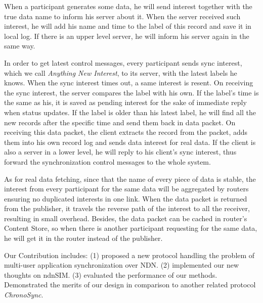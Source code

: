 \documentclass[conference]{IEEEtran}
\begin{document}
When a participant generates some data, he will send interest together with the true data name to inform his server about it. When the server received such interest, he will add his name and time to the label of this record and save it in local log. If there is an upper level server, he will inform his server again in the same way. 

In order to get latest control messages, every participant sends sync interest, which we call \emph{Anything New Interest}, to its server, with the latest labels he knows. When the sync interest times out, a same interest is resent. On receiving the sync interest, the server compares the label with his own. If the label's time is the same as his, it is saved as pending interest for the sake of immediate reply when status updates. If the label is older than his latest label, he will find all the new records after the specific time and send them back in data packet. On receiving this data packet, the client extracts the record from the packet, adds them into his own record log and sends data interest for real data. If the client is also a server in a lower level, he will reply to his client's sync interest, thus forward the synchronization control messages to the whole system.

As for real data fetching, since that the name of every piece of data is stable, the interest from every participant for the same data will be aggregated by routers ensuring no duplicated interests in one link. When the data packet is returned from the publisher, it travels the reverse path of the interest to all the receiver, resulting in small overhead. Besides, the data packet can be cached in router's Content Store, so when there is another participant requesting for the same data, he will get it in the router instead of the publisher.

Our Contribution includes: (1) proposed a new protocol handling the problem of multi-user application synchronization over NDN. (2) implemented our new thoughts on ndnSIM\cite{ndnSIM}. (3) evaluated the performance of our methods. Demonstrated the merits of our design in comparison to another related protocol \emph{ChronoSync\cite{ChronoSync}}.

\end{document}
